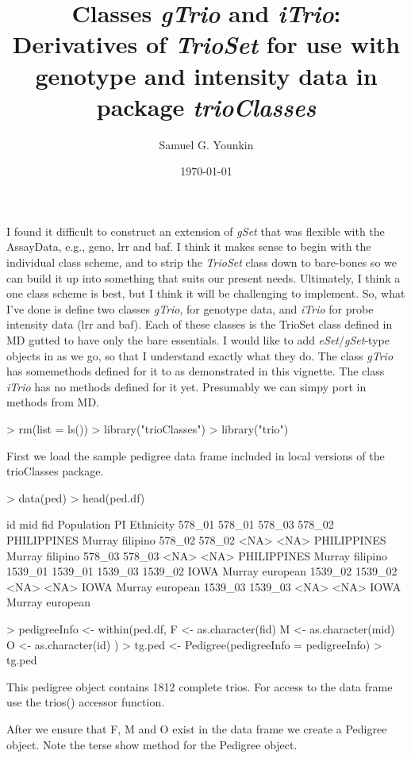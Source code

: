 \documentclass[10pt]{article}
\title{Classes \emph{gTrio} and \emph{iTrio}: Derivatives of \emph{TrioSet} for use with genotype and intensity data in package \emph{trioClasses}}
\author{Samuel G. Younkin}
\date{\today}
\begin{document}
\setlength{\parskip}{0.2\baselineskip}
\setlength{\parindent}{0pt}
\maketitle
I found it difficult to construct an extension of \emph{gSet} that was flexible with the AssayData, e.g., geno, lrr and baf.  I think it makes sense to begin with the individual class scheme, and to strip the \emph{TrioSet} class down to bare-bones so we can build it up into something that suits our present needs.  Ultimately, I think a one class scheme is best, but I think it will be challenging to implement.  So, what I've done is define two classes \emph{gTrio}, for genotype data, and \emph{iTrio} for probe intensity data (lrr and baf).  Each of these classes is the TrioSet class defined in MD gutted to have only the bare essentials.  I would like to add  \emph{eSet}/\emph{gSet}-type objects in as we go, so that I understand exactly what they do.  The class \emph{gTrio} has somemethods defined for it to as demonstrated in this vignette.  The class \emph{iTrio} has no methods defined for it yet.  Presumably we can simpy port in methods from MD.
\begin{Schunk}
\begin{Sinput}
> rm(list = ls())
> library("trioClasses")
> library("trio")
\end{Sinput}
\end{Schunk}
First we load the sample pedigree data frame included in local versions of the trioClasses package.
\begin{Schunk}
\begin{Sinput}
> data(ped)
> head(ped.df)
\end{Sinput}
\begin{Soutput}
             id     mid     fid  Population     PI Ethnicity
578_01   578_01  578_03  578_02 PHILIPPINES Murray  filipino
578_02   578_02    <NA>    <NA> PHILIPPINES Murray  filipino
578_03   578_03    <NA>    <NA> PHILIPPINES Murray  filipino
1539_01 1539_01 1539_03 1539_02        IOWA Murray  european
1539_02 1539_02    <NA>    <NA>        IOWA Murray  european
1539_03 1539_03    <NA>    <NA>        IOWA Murray  european
\end{Soutput}
\begin{Sinput}
> pedigreeInfo <- within(ped.df, {
     F <- as.character(fid)
     M <- as.character(mid)
     O <- as.character(id)
 })
> tg.ped <- Pedigree(pedigreeInfo = pedigreeInfo)
> tg.ped
\end{Sinput}
\begin{Soutput}
This pedigree object contains 1812 complete trios.
For access to the data frame use the trios() accessor function.
\end{Soutput}
\end{Schunk}
After we ensure that F, M and O exist in the data frame we create a Pedigree object.  Note the terse show method for the Pedigree object.
\end{document}
